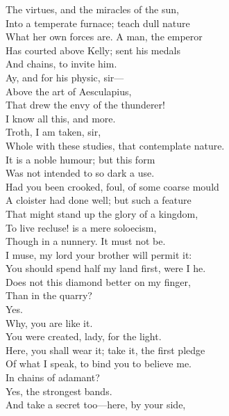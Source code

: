 \documentclass[a4paper,oneside]{memoir}
\begin{document}
\begin{drama*}
The virtues, and the miracles of the sun,\\
Into a temperate furnace; teach dull nature\\
What her own forces are. A man, the emperor\\
Has courted above Kelly; sent his medals\\
And chains, to invite him.\\
\dolspeaks {} Ay, and for his physic, sir---\\
\mammonspeaks Above the art of Aesculapius,\\
That drew the envy of the thunderer!\\
I know all this, and more.\\
\dolspeaks {} Troth, I am taken, sir,\\
Whole with these studies, that contemplate nature.\\
\mammonspeaks It is a noble humour; but this form\\
Was not intended to so dark a use.\\
Had you been crooked, foul, of some coarse mould\\
A cloister had done well; but such a feature\\
That might stand up the glory of a kingdom,\\
To live recluse! is a mere soloecism,\\
Though in a nunnery. It must not be.\\
I muse, my lord your brother will permit it:\\
You should spend half my land first, were I he.\\
Does not this diamond better on my finger,\\
Than in the quarry?\\
\dolspeaks {} Yes.\\
\mammonspeaks {} Why, you are like it.\\
You were created, lady, for the light.\\
Here, you shall wear it; take it, the first pledge\\
Of what I speak, to bind you to believe me.\\
\dolspeaks In chains of adamant?\\
\mammonspeaks {} Yes, the strongest bands.\\
And take a secret too---here, by your side,\\

\end{drama*}
\end{document}
